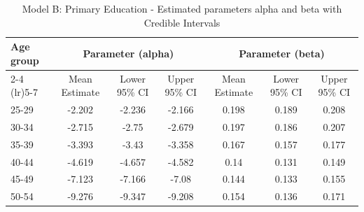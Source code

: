 \begin{landscape}
\begin{table}[htbp]
\centering
\caption{Model B: Primary Education - Estimated parameters alpha and beta  with Credible Intervals}
\label{tab:Fparameters_ab6}
\begin{tabular}{@{}lcccccc@{}}
\toprule
Age group & \multicolumn{3}{c}{Parameter (alpha)} & \multicolumn{3}{c}{Parameter (beta)} \\ 
\cmidrule(lr){2-4} \cmidrule(lr){5-7}
          & Mean Estimate & Lower 95\% CI & Upper 95\% CI & Mean Estimate & Lower 95\% CI & Upper 95\% CI \\ 
\midrule
25-29 & -2.202 & -2.236 & -2.166 & 0.198 & 0.189 & 0.208 \\
30-34 & -2.715 & -2.75 & -2.679 & 0.197 & 0.186 & 0.207 \\
35-39 & -3.393 & -3.43 & -3.358 & 0.167 & 0.157 & 0.177 \\
40-44 & -4.619 & -4.657 & -4.582 & 0.14 & 0.131 & 0.149 \\
45-49 & -7.123 & -7.166 & -7.08 & 0.144 & 0.133 & 0.155 \\
50-54 & -9.276 & -9.347 & -9.208 & 0.154 & 0.136 & 0.171 \\
\bottomrule
\end{tabular}
\end{table}
\end{landscape}